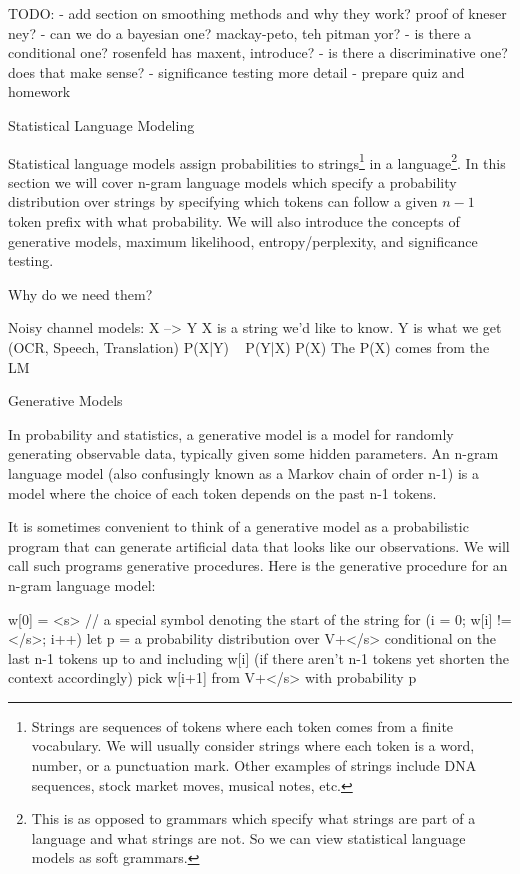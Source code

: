 TODO:
- add section on smoothing methods and why they work?  proof of kneser ney?
- can we do a bayesian one?  mackay-peto, teh pitman yor?
- is there a conditional one?  rosenfeld has maxent, introduce?
- is there a discriminative one?  does that make sense?
- significance testing more detail
- prepare quiz and homework

Statistical Language Modeling

Statistical language models assign probabilities to
strings\footnote{Strings are sequences of tokens where each token
  comes from a finite vocabulary.  We will usually consider strings
  where each token is a word, number, or a punctuation mark.  Other
  examples of strings include DNA sequences, stock market moves,
  musical notes, etc.}  in a language\footnote{This is as opposed to
  grammars which specify what strings are part of a language and what
  strings are not.  So we can view statistical language models as soft
  grammars.}.  In this section we will cover n-gram language models
which specify a probability distribution over strings by specifying
which tokens can follow a given $n-1$ token prefix with what
probability.  We will also introduce the concepts of generative
models, maximum likelihood, entropy/perplexity, and significance
testing.

Why do we need them?

Noisy channel models: X --> Y
X is a string we'd like to know.
Y is what we get (OCR, Speech, Translation)
P(X|Y) ~ P(Y|X) P(X)
The P(X) comes from the LM


Generative Models

In probability and statistics, a generative model is a model for
randomly generating observable data, typically given some hidden
parameters.  An n-gram language model (also confusingly known as a
Markov chain of order n-1) is a model where the choice of each token
depends on the past n-1 tokens.

It is sometimes convenient to think of a generative model as a
probabilistic program that can generate artificial data that looks
like our observations.  We will call such programs generative
procedures.  Here is the generative procedure for an n-gram language
model:

w[0] = <s>  // a special symbol denoting the start of the string
for (i = 0; w[i] != </s>; i++) {
  let p = a probability distribution over V+</s> conditional on the
  last n-1 tokens up to and including w[i] (if there aren't n-1 tokens
  yet shorten the context accordingly)
  pick w[i+1] from V+</s> with probability p
}

